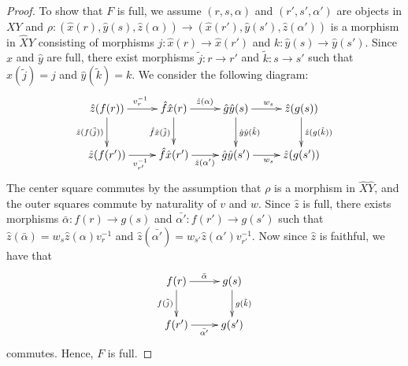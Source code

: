 \documentclass{article}
\renewcommand{\to}{\rightarrow}
\newcommand{\maps}{\colon}
\begin{document}
\begin{proof}
To show that $F$ is full, we assume $(r,s,\alpha)$ and
$(r',s',\alpha')$ are objects in $XY$ and $\rho \maps
(\hat{x}(r),\hat{y}(s),\hat{z}(\alpha)) \to
(\hat{x}(r'),\hat{y}(s'),\hat{z}(\alpha'))$ is a morphism in
$\hat{X}\hat{Y}$ consisting of morphisms $j \maps \hat{x}(r) \to
\hat{x}(r')$ and $k \maps \hat{y}(s) \to \hat{y}(s')$.  Since
$\hat{x}$ and $\hat{y}$ are full, there exist morphisms $\tilde{j}
\maps r \to r'$ and $\tilde{k}\maps s \to s'$ such that
$\hat{x}(\tilde{j}) = j$ and $\hat{y}(\tilde{k}) = k$.  We consider
the following diagram:
\[
\xymatrix{
\hat{z}(f(r))\ar[r]^{v_r^{-1}} \ar[d]_{\hat{z}(f(\tilde{j}))} & \hat{f}\hat{x}(r)\ar[r]^{\hat{z}(\alpha)}\ar[d]_{\hat{f}\hat{x}(\tilde{j})} & \hat{g}\hat{y}(s)\ar[r]^{w_s}\ar[d]^{\hat{g}\hat{y}(\tilde{k})} & \hat{z}(g(s)) \ar[d]^{\hat{z}(g(\tilde{k}))} \\
\hat{z}(f(r'))\ar[r]_{v_{r'}^{-1}} & \hat{f}\hat{x}(r') \ar[r]_{\hat{z}(\alpha')} & \hat{g}\hat{y}(s')\ar[r]_{w_s} & \hat{z}(g(s'))
}
\]
The center square commutes by the assumption that $\rho$ is a morphism
in $\hat{X}\hat{Y}$, and the outer squares commute by naturality of
$v$ and $w$.  Since $\hat{z}$ is full, there exists morphisms
$\bar{\alpha}\maps f(r) \to g(s)$ and $\bar{\alpha'} \maps f(r') \to
g(s')$ such that $\hat{z}(\bar{\alpha}) = w_s\hat{z}(\alpha)v_r^{-1}$
and $\hat{z}(\bar{\alpha'}) = w_{s'}\hat{z}(\alpha')v_{r'}^{-1}$.  Now
since $\hat{z}$ is faithful, we have that
\[
\xymatrix{
f(r)\ar[r]^{\bar{\alpha}} \ar[d]_{f(\tilde{j})} & g(s) \ar[d]^{g(\tilde{k})} \\
f(r') \ar[r]_{\bar{\alpha'}} & g(s')
}
\]
commutes.  Hence, $F$ is full.


\end{proof}
\end{document}
